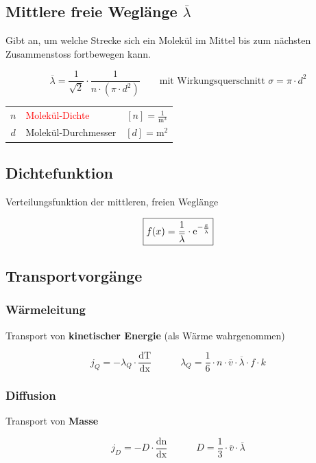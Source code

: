 \subsection{Mittlere freie Weglänge $\overline{\lambda}$}

Gibt an, um welche Strecke sich ein Molekül im Mittel bis zum nächsten Zusammenstoss fortbewegen kann.

$$ \boxed{ \overline{\lambda} = \frac{1}{\sqrt{2}} \cdot \frac{1}{n \cdot (\pi \cdot d^2 )} }  \qquad \text{mit Wirkungsquerschnitt } \sigma = \pi \cdot d^2$$

\begin{tabular}{c l c}
	\rule{0pt}{8pt}$n$ & \textcolor{red}{Molekül-Dichte} & $[n] = \mathrm{\frac{1}{m^3}}$\\	
	$d$ & Molekül-Durchmesser & $[d] = \mathrm{m^2}$ \\
\end{tabular}




\subsection{Dichtefunktion}
Verteilungsfunktion der mittleren, freien Weglänge 

$$ \boxed{ f(x) = \frac{1}{\overline{\lambda}} \cdot \mathrm{e}^{- \frac{x}{\overline{\lambda}}}  } $$


\subsection{Transportvorgänge}

\subsubsection{Wärmeleitung}
Transport von \textbf{kinetischer Energie} (als Wärme wahrgenommen)

$$ \boxed{ j_Q = - \lambda_Q \cdot \frac{\mathrm{dT}}{\mathrm{dx}} \qquad \quad \lambda_Q = \frac{1}{6} \cdot n \cdot \overline{v} \cdot \overline{\lambda} \cdot f \cdot k }  $$




\subsubsection{Diffusion}
Transport von \textbf{Masse} 


$$ \boxed{ j_D = -D \cdot \frac{\mathrm{dn}}{\mathrm{dx}} \qquad \quad  D = \frac{1}{3} \cdot \overline{v} \cdot \overline{\lambda} }  $$



